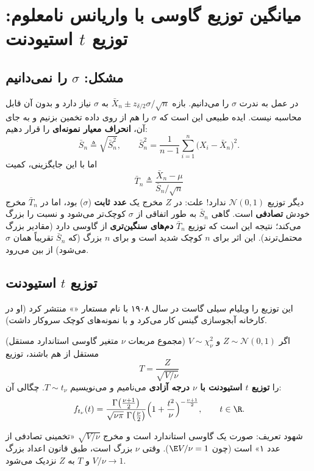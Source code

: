 \section{میانگین توزیع گاوسی با واریانس نامعلوم: توزیع $t$ استیودنت}

\subsection{مشکل: $\sigma$ را نمی‌دانیم}
در عمل به ندرت $\sigma$ را می‌دانیم. بازه $\bar X_n\pm z_{\delta/2}\sigma/\sqrt n$ به $\sigma$ نیاز دارد و بدون آن قابل محاسبه نیست. ایده طبیعی این است که $\sigma$ را هم از روی داده تخمین بزنیم و به جای آن، \textbf{انحراف معیار نمونه‌ای} را قرار دهیم:
\[
\bar S_n\triangleq\sqrt{\bar S_n^2},\qquad \bar S_n^2=\frac{1}{n-1}\sum_{i=1}^n\big(X_i-\bar X_n\big)^2 .
\]
اما با این جایگزینی، کمیت
\[
\bar T_n\triangleq\frac{\bar X_n-\mu}{\bar S_n/\sqrt n}
\]
دیگر توزیع $\mathcal N(0,1)$ ندارد! علت: در $Z$ مخرج یک \textbf{عدد ثابت} ($\sigma$) بود، اما در $\bar T_n$ مخرج خودش \textbf{تصادفی} است. گاهی $\bar S_n$ به طور اتفاقی از $\sigma$ کوچک‌تر می‌شود و نسبت را بزرگ می‌کند؛ نتیجه این است که توزیع $\bar T_n$ \textbf{دم‌های سنگین‌تری} از گاوسی دارد (مقادیر بزرگ محتمل‌ترند). این اثر برای $n$ کوچک شدید است و برای $n$ بزرگ (که $\bar S_n$ تقریباً همان $\sigma$ می‌شود) از بین می‌رود.

\subsection{توزیع $t$ استیودنت}
این توزیع را ویلیام سیلی گاست در سال ۱۹۰۸ با نام مستعار «» منتشر کرد (او در کارخانه آبجوسازی گینس کار می‌کرد و با نمونه‌های کوچک سروکار داشت).

\begin{definition}
اگر $Z\sim\mathcal N(0,1)$ و $V\sim\chi^2_\nu$ (مجموع مربعات $\nu$ متغیر گاوسی استاندارد مستقل) مستقل از هم باشند، توزیع
\[
T=\frac{Z}{\sqrt{V/\nu}}
\]
را \textbf{توزیع $t$ استیودنت با $\nu$ درجه آزادی} می‌نامیم و می‌نویسیم $T\sim t_\nu$. چگالی آن:
\[
f_{t_\nu}(t)=\frac{\Gamma\big(\frac{\nu+1}{2}\big)}{\sqrt{\nu\pi}\ \Gamma\big(\frac\nu2\big)}\Big(1+\frac{t^2}{\nu}\Big)^{-\frac{\nu+1}{2}},\qquad t\in\R .
\]
\end{definition}

شهود تعریف: صورت یک گاوسی استاندارد است و مخرج $\sqrt{V/\nu}$ «تخمینی تصادفی از عدد ۱» است (چون $\E V/\nu=1$). وقتی $\nu$ بزرگ است، طبق قانون اعداد بزرگ $V/\nu\to1$ و $T$ به $Z$ نزدیک می‌شود.

